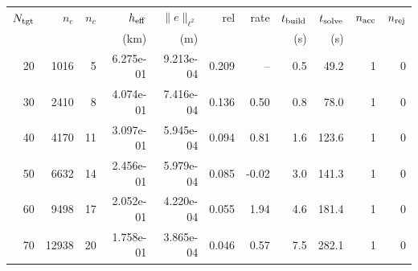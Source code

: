 \begin{tabular}{rrrrrrrrrrr}
\hline
$N_{\rm tgt}$ & $n_e$ & $n_c$ & $h_{\rm eff}$ & $\|e\|_{\ell^2}$ & rel & rate & $t_{\rm build}$ & $t_{\rm solve}$ & $n_{\rm acc}$ & $n_{\rm rej}$ \\
 & & & (km) & (m) & & & (s) & (s) & & \\
\hline
20 & 1016 & 5 & 6.275e-01 & 9.213e-04 & 0.209 & -- & 0.5 & 49.2 & 1 & 0 \\
30 & 2410 & 8 & 4.074e-01 & 7.416e-04 & 0.136 & 0.50 & 0.8 & 78.0 & 1 & 0 \\
40 & 4170 & 11 & 3.097e-01 & 5.945e-04 & 0.094 & 0.81 & 1.6 & 123.6 & 1 & 0 \\
50 & 6632 & 14 & 2.456e-01 & 5.979e-04 & 0.085 & -0.02 & 3.0 & 141.3 & 1 & 0 \\
60 & 9498 & 17 & 2.052e-01 & 4.220e-04 & 0.055 & 1.94 & 4.6 & 181.4 & 1 & 0 \\
70 & 12938 & 20 & 1.758e-01 & 3.865e-04 & 0.046 & 0.57 & 7.5 & 282.1 & 1 & 0 \\
\hline
\end{tabular}

